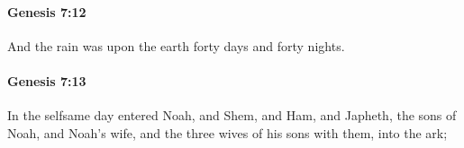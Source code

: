		\paragraph{Genesis 7:12} %
			\label{GENESIS-7-12}

			And the rain was upon the earth forty days and forty nights.


		\paragraph{Genesis 7:13} %
			\label{GENESIS-7-13}

			In the selfsame day entered Noah, and Shem, and Ham, and Japheth, the sons of Noah, and Noah's wife, and the three wives of his sons with them, into the ark;


